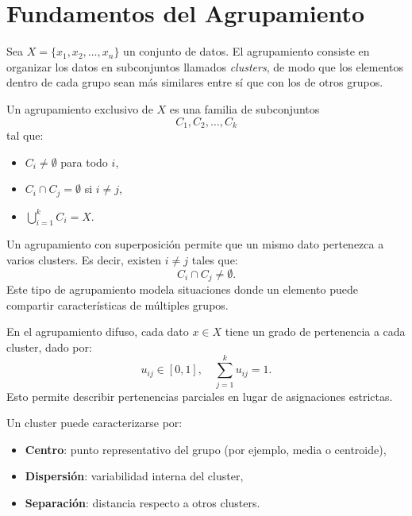 \documentclass[a4,11pt]{aleph-notas}
\begin{document}
\encabezado

\section{Fundamentos del Agrupamiento}

\begin{defi}[Agrupamiento]
Sea \(X = \{x_1, x_2, \ldots, x_n\}\) un conjunto de datos.  
El agrupamiento consiste en organizar los datos en subconjuntos llamados \emph{clusters}, de modo que los elementos dentro de cada grupo sean más similares entre sí que con los de otros grupos.
\end{defi}

\begin{defi}
Un agrupamiento exclusivo de \(X\) es una familia de subconjuntos
\[
C_1, C_2, \ldots, C_k
\]
tal que:
\begin{itemize}
    \item \(C_i \neq \emptyset\) para todo \(i\),
    \item \(C_i \cap C_j = \emptyset\) si \(i \neq j\),
    \item \(\bigcup_{i=1}^{k} C_i = X\).
\end{itemize}
\end{defi}

\begin{defi}
Un agrupamiento con superposición permite que un mismo dato pertenezca a varios clusters.  
Es decir, existen \(i \neq j\) tales que:
\[
C_i \cap C_j \neq \emptyset.
\]
Este tipo de agrupamiento modela situaciones donde un elemento puede compartir características de múltiples grupos.
\end{defi}

\begin{defi}
En el agrupamiento difuso, cada dato \(x \in X\) tiene un grado de pertenencia a cada cluster, dado por:
\[
u_{ij} \in [0,1], \quad \sum_{j=1}^{k} u_{ij} = 1.
\]
Esto permite describir pertenencias parciales en lugar de asignaciones estrictas.
\end{defi}

\begin{defi}
Un cluster puede caracterizarse por:
\begin{itemize}
    \item \textbf{Centro}: punto representativo del grupo (por ejemplo, media o centroide),
    \item \textbf{Dispersión}: variabilidad interna del cluster,
    \item \textbf{Separación}: distancia respecto a otros clusters.
\end{itemize}
\end{defi}
\end{document}
